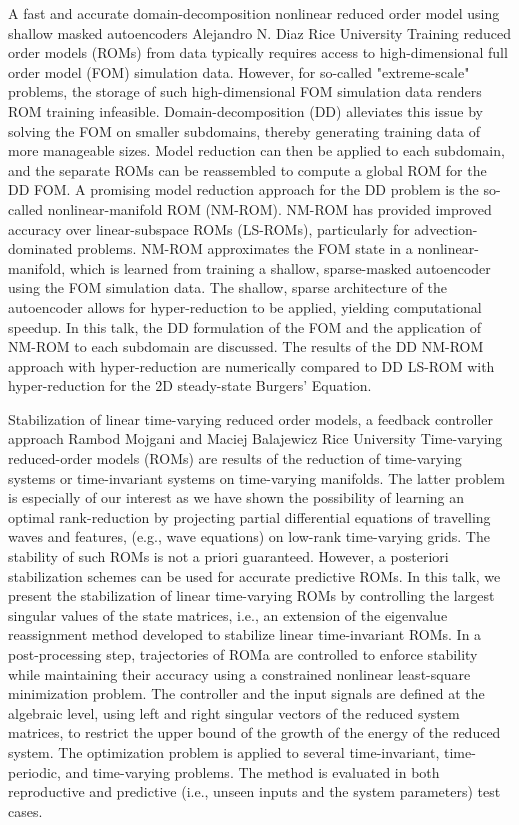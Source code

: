 \begin{addmargin}[2em]{0em}
\vspace{1.5ex}
\abs
{A fast and accurate domain-decomposition nonlinear reduced order model using shallow masked autoencoders}
{Alejandro N. Diaz}
{Rice University}
{Training reduced order models (ROMs) from data typically requires access to high-dimensional full order model (FOM) simulation data. However, for so-called "extreme-scale" problems, the storage of such high-dimensional FOM simulation data renders ROM training infeasible. Domain-decomposition (DD) alleviates this issue by solving the FOM on smaller subdomains, thereby generating training data of more manageable sizes. Model reduction can then be applied to each subdomain, and the separate ROMs can be reassembled to compute a global ROM for the DD FOM. A promising model reduction approach for the DD problem is the so-called nonlinear-manifold ROM (NM-ROM). NM-ROM has provided improved accuracy over linear-subspace ROMs (LS-ROMs), particularly for advection-dominated problems. NM-ROM approximates the FOM state in a nonlinear-manifold, which is learned from training a shallow, sparse-masked autoencoder using the FOM simulation data. The shallow, sparse architecture of the autoencoder allows for hyper-reduction to be applied, yielding computational speedup. In this talk, the DD formulation of the FOM and the application of NM-ROM to each subdomain are discussed. The results of the DD NM-ROM approach with hyper-reduction are numerically compared to DD LS-ROM with hyper-reduction for the 2D steady-state Burgers' Equation.}


\vspace{1.5ex}
\abs
{Stabilization of linear time-varying reduced order models, a feedback controller approach}
{Rambod Mojgani and Maciej Balajewicz}
{Rice University}
{Time-varying reduced-order models (ROMs) are results of the reduction of time-varying systems or time-invariant systems on time-varying manifolds.
The latter problem is especially of our interest as we have shown the possibility of learning an optimal rank-reduction by projecting partial differential equations of travelling waves and features, (e.g., wave equations) on low-rank time-varying grids.
The stability of such ROMs is not a priori guaranteed. However, a posteriori stabilization schemes can be used for accurate predictive ROMs. In this talk, we present the stabilization of linear time-varying ROMs by controlling the largest singular values of the state matrices, i.e., an extension of the eigenvalue reassignment method developed to stabilize linear time-invariant ROMs.
In a post-processing step, trajectories of ROMa are controlled to enforce stability while maintaining their accuracy using a constrained nonlinear least-square minimization problem. The controller and the input signals are defined at the algebraic level, using left and right singular vectors of the reduced system matrices, to restrict the upper bound of the growth of the energy of the reduced system. The optimization problem is applied to several time-invariant, time-periodic, and time-varying problems. The method is evaluated in both reproductive and predictive (i.e., unseen inputs and the system parameters) test cases.}



\end{addmargin}
